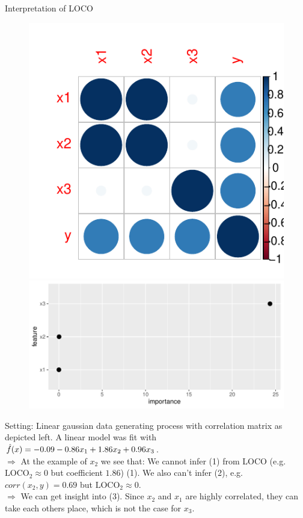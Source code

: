 \documentclass[11pt,compress,t,notes=noshow, aspectratio=169, xcolor=table]{beamer}
\begin{document}
\begin{vbframe}{Interpretation of LOCO}

\begin{figure}
\centering
\hfill
	\includegraphics[width=0.25\linewidth]{figure_man/simulation_corr.pdf} 
\hfill
  \includegraphics[width=0.5\linewidth]{figure_man/simulation_loco}
  \hfill
\end{figure}

Setting: Linear gaussian data generating process with correlation matrix as depicted left. A linear model was fit with $\fh(x) = -0.09 - 0.86 x_1 + 1.86 x_2 + 0.96 x_3$.\\
\lz
$\Rightarrow$ At the example of $x_2$ we see that: We cannot infer (1) from LOCO (e.g. $\text{LOCO}_2 \approx 0$ but coefficient $1.86$) (1). We also can't infer (2), e.g. $corr(x_2, y) = 0.69$ but $\text{LOCO}_2 \approx 0$.\\
$\Rightarrow$ We can get insight into (3). Since $x_2$ and $x_1$ are highly correlated, they can take each others place, which is not the case for $x_3$.
\framebreak


\end{vbframe}
\end{document}
